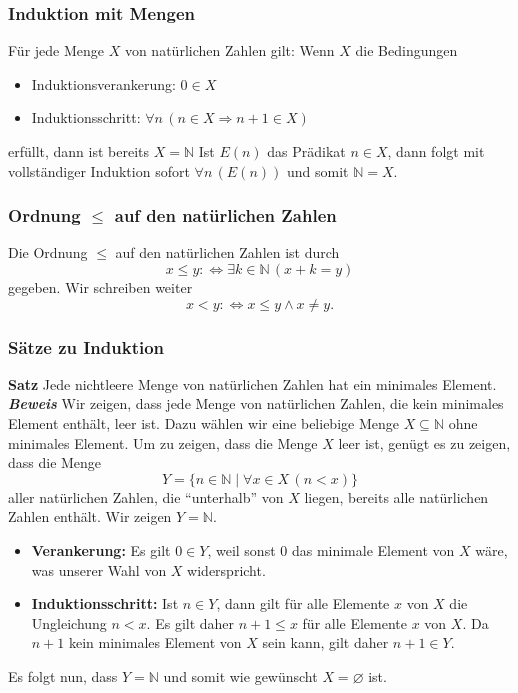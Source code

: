 \subsubsection{Induktion mit Mengen}
Für jede Menge $X$ von natürlichen Zahlen gilt: Wenn $X$ die Bedingungen
\begin{itemize}
	\item Induktionsverankerung: $0\in X$
	\item Induktionsschritt: $\forall n\,(n\in X\Rightarrow n+1\in X)$
\end{itemize}
erfüllt, dann ist bereits $X=\mathbb{N}$
Ist $E(n)$ das Prädikat $n\in X$, dann folgt mit vollständiger Induktion sofort $\forall n\, (E(n))$ und somit $\mathbb{N}=X$.

\subsubsection{Ordnung $\leq$ auf den natürlichen Zahlen}
Die Ordnung $\leq$ auf den natürlichen Zahlen ist durch
\[
	x\leq y:\Leftrightarrow \exists k\in\mathbb{N}\,(x+k=y)
\]
gegeben. Wir schreiben weiter
\[
	x<y:\Leftrightarrow x\leq y\land x\neq y.
\]

\subsubsection{Sätze zu Induktion}
\textbf{Satz} Jede nichtleere Menge von natürlichen Zahlen hat ein minimales Element. \\
\textbf{\textit{Beweis}}
Wir zeigen, dass jede Menge von natürlichen Zahlen, die kein minimales Element enthält, leer ist. Dazu wählen wir eine beliebige Menge $X\subseteq\mathbb{N}$ ohne minimales Element. Um zu zeigen, dass die Menge $X$ leer ist, genügt es zu zeigen, dass die Menge
\[
	Y=\{n\in\mathbb{N}\mid \forall x\in X\,(n<x) \}
\]
aller natürlichen Zahlen, die ``unterhalb'' von $X$ liegen, bereits alle natürlichen Zahlen enthält. Wir zeigen $Y=\mathbb{N}$.
\begin{itemize}
	\item \textbf{Verankerung:} Es gilt $0\in Y$, weil sonst $0$ das minimale Element von $X$ wäre, was unserer Wahl von $X$ widerspricht.
	\item \textbf{Induktionsschritt:} Ist $n\in Y$, dann gilt für alle Elemente $x$ von $X$ die Ungleichung $n<x$. Es gilt daher $n+1\leq x$ für alle Elemente $x$ von $X$. Da $n+1$ kein minimales Element von $X$ sein kann, gilt daher $n+1\in Y$.
\end{itemize}
Es folgt nun, dass $Y=\mathbb{N}$ und somit wie gewünscht $X=\varnothing$ ist.
\\

